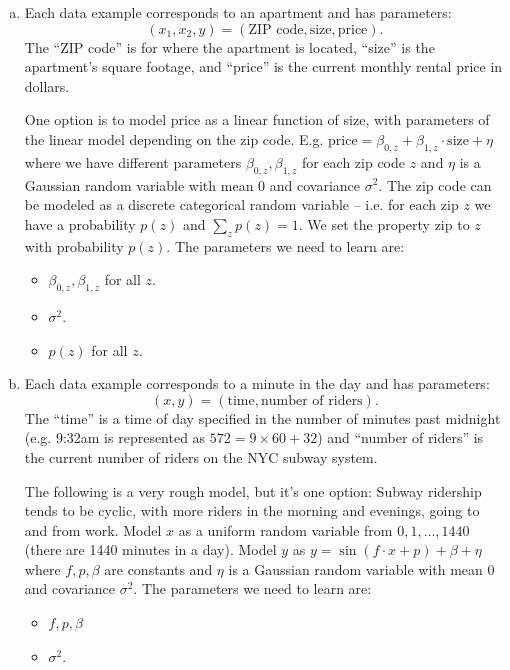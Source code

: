 \documentclass[10pt]{article}
\begin{document}
\begin{enumerate}[(a)]
	\item Each data example corresponds to an apartment and has parameters: $$(x_1,x_2, y) = (\text{ZIP code}, \text{size}, \text{price}).$$ The ``ZIP code'' is for where the apartment is located, ``size'' is the apartment's square footage, and ``price'' is the current monthly rental price in dollars. 
	
		\color{blue}
		One option is to model $\text{price}$ as a linear function of size, with parameters of the linear model depending on the zip code. E.g. $\text{price} = \beta_{0,z} + \beta_{1,z}\cdot \text{size} + \eta$ where we have different parameters $\beta_{0,z}, \beta_{1,z}$ for each zip code $z$ and $\eta$ is a Gaussian random variable with mean $0$ and covariance $\sigma^2$. The zip code can be modeled as a discrete categorical random variable -- i.e. for each zip $z$ we have a probability $p(z)$ and $\sum_{z} p(z) = 1$. We set the property zip to $z$ with probability $p(z)$.  The parameters we need to learn are:
		\begin{itemize}
			\item $\beta_{0,z}, \beta_{1,z}$ for all $z$.
			\item $\sigma^2$.
			\item $p(z)$ for all $z$. 
		\end{itemize}
		\color{black}
	
	\item Each data example corresponds to a minute in the day and has parameters: $$(x,y) = (\text{time}, \text{number of riders}).$$ The ``time''  is a time of day specified in the number of minutes past midnight (e.g. 9:32am is represented as $572 = 9\times 60 + 32$) and ``number of riders'' is the current number of riders on the NYC subway system.
	
	\color{blue}
	The following is a very rough model, but it's one option: Subway ridership tends to be cyclic, with more riders in the morning and evenings, going to and from work. Model $x$ as a uniform random variable from $0, 1, \ldots, 1440$ (there are 1440 minutes in a day). Model $y$ as $y = \sin(f\cdot x + p) + \beta + \eta$ where $f,p,\beta$ are constants and $\eta$ is a Gaussian random variable with mean $0$ and covariance $\sigma^2$. The parameters we need to learn are:
	\begin{itemize}
		\item $f,p,\beta$ 
		\item $\sigma^2$.
	\end{itemize}
	\color{black}
	

\end{enumerate}
\end{document}
